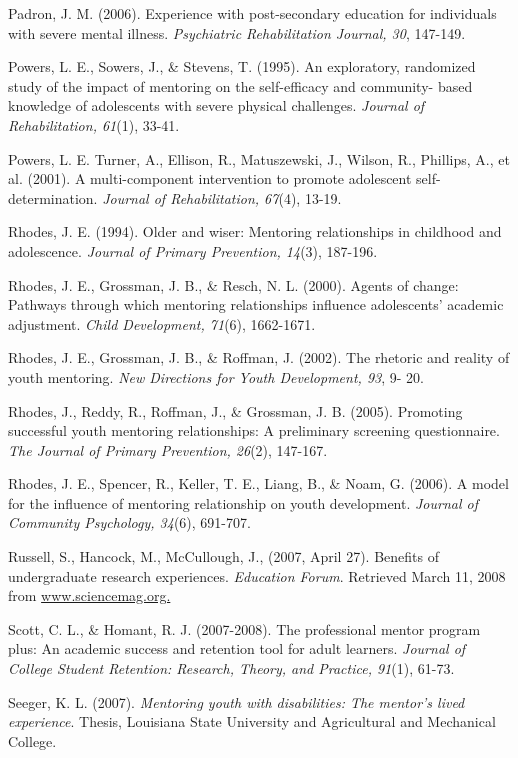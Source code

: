 \documentclass[11.5pt]{sig-alternate} %
\begin{document}
Padron, J. M. (2006). Experience with post-secondary education for individuals with severe mental illness. \textit{Psychiatric Rehabilitation Journal, 30}, 147-149.

Powers, L. E., Sowers, J., \& Stevens, T. (1995). An exploratory, randomized study of the impact of mentoring on the self-efficacy and community- based knowledge of adolescents with severe physical challenges. \textit{Journal of Rehabilitation, 61}(1), 33-41.

Powers, L. E. Turner, A., Ellison, R., Matuszewski, J., Wilson, R., Phillips, A., et al. (2001). A multi-component intervention to promote adolescent self-determination. \textit{Journal of Rehabilitation, 67}(4), 13-19.

Rhodes, J. E. (1994). Older and wiser: Mentoring relationships in childhood and adolescence. \textit{Journal of Primary Prevention, 14}(3), 187-196.

Rhodes, J. E., Grossman, J. B., \& Resch, N. L. (2000). Agents of change: Pathways through which mentoring relationships influence adolescents' academic adjustment. \textit{Child Development, 71}(6), 1662-1671.

Rhodes, J. E., Grossman, J. B., \& Roffman, J. (2002). The rhetoric and reality of youth mentoring. \textit{New Directions for Youth Development, 93}, 9- 20.

Rhodes, J., Reddy, R., Roffman, J., \& Grossman, J. B. (2005). Promoting successful youth mentoring relationships: A preliminary screening questionnaire. \textit{The Journal of Primary Prevention, 26}(2), 147-167.

Rhodes, J. E., Spencer, R., Keller, T. E., Liang, B., \& Noam, G. (2006). A model for the influence of mentoring relationship on youth development. \textit{Journal of Community Psychology, 34}(6), 691-707.

Russell, S., Hancock, M., McCullough, J., (2007, April 27). Benefits of undergraduate research experiences. \textit{Education Forum}. Retrieved March 11, 2008 from \url{www.sciencemag.org.}

Scott, C. L., \& Homant, R. J. (2007-2008). The professional mentor program plus: An academic success and retention tool for adult learners. \textit{Journal of College Student Retention: Research, Theory, and Practice, 91}(1), 61-73.

Seeger, K. L. (2007). \textit{Mentoring youth with disabilities: The mentor’s lived experience}. Thesis, Louisiana State University and Agricultural and Mechanical College.
\end{document}

